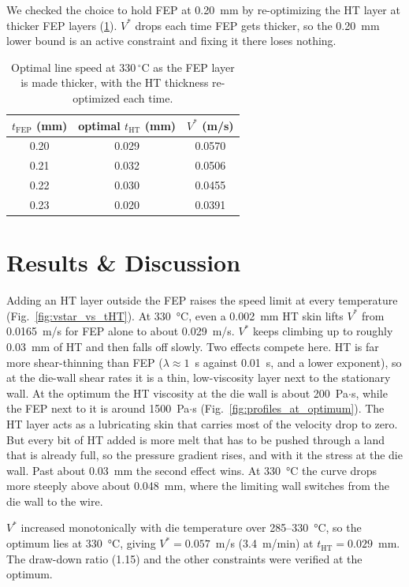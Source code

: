 \documentclass[11pt]{article}
\begin{document}
We checked the choice to hold FEP at 0.20~mm by re-optimizing the HT layer at thicker FEP layers (\cref{tab:fep_thickness}). $V^*$ drops each time FEP gets thicker, so the 0.20~mm lower bound is an active constraint and fixing it there loses nothing.

\begin{table}[h]
\caption{Optimal line speed at 330\,$^\circ$C as the FEP layer is made thicker, with the HT thickness re-optimized each time.}
\centering
\begin{tabular}{@{}ccc@{}}
\toprule
$t_\text{FEP}$ (mm) & optimal $t_\text{HT}$ (mm) & $V^*$ (m/s) \\
\midrule
0.20 & 0.029 & 0.0570 \\
0.21 & 0.032 & 0.0506 \\
0.22 & 0.030 & 0.0455 \\
0.23 & 0.020 & 0.0391 \\
\bottomrule
\end{tabular}
\label{tab:fep_thickness}
\end{table}


\section*{Results \& Discussion}

Adding an HT layer outside the FEP raises the speed limit at every temperature (Fig.~\ref{fig:vstar_vs_tHT}). At 330~°C, even a 0.002~mm HT skin lifts $V^*$ from 0.0165~m/s for FEP alone to about 0.029~m/s. $V^*$ keeps climbing up to roughly 0.03~mm of HT and then falls off slowly. Two effects compete here. HT is far more shear-thinning than FEP ($\lambda \approx 1$~s against 0.01~s, and a lower exponent), so at the die-wall shear rates it is a thin, low-viscosity layer next to the stationary wall. At the optimum the HT viscosity at the die wall is about 200~Pa$\cdot$s, while the FEP next to it is around 1500~Pa$\cdot$s (Fig.~\ref{fig:profiles_at_optimum}). The HT layer acts as a lubricating skin that carries most of the velocity drop to zero. But every bit of HT added is more melt that has to be pushed through a land that is already full, so the pressure gradient rises, and with it the stress at the die wall. Past about 0.03~mm the second effect wins. At 330~°C the curve drops more steeply above about 0.048~mm, where the limiting wall switches from the die wall to the wire.

$V^*$ increased monotonically with die temperature over 285--330~°C, so the optimum lies at 330~°C, giving $V^* = 0.057$~m/s (3.4~m/min) at $t_\text{HT} = 0.029$~mm. The draw-down ratio (1.15) and the other constraints were verified at the optimum.
\end{document}
